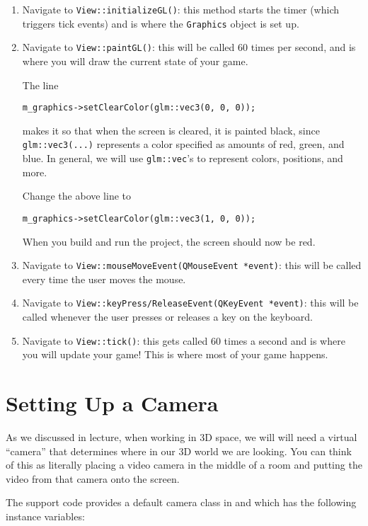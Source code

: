 \documentclass{cs195u}
\begin{document}
\begin{enumerate}
\item Navigate to \texttt{View::initializeGL()}: this method starts the timer (which triggers tick events) and is where the \texttt{Graphics} object is set up.

\item  Navigate to \texttt{View::paintGL()}: this will be called 60 times per second, and is where you will draw the current state of your game.

The line

         \texttt{m\_graphics->setClearColor(glm::vec3(0, 0, 0));}
         
makes it so that when the screen is cleared, it is painted black, since \texttt{glm::vec3(...)} represents a color specified as amounts of red, green, and blue. In general, we will use \texttt{glm::vec}’s to represent colors, positions, and more.

Change the above line to

         \texttt{m\_graphics->setClearColor(glm::vec3(1, 0, 0));}
         
When you build and run the project, the screen should now be red.

\item Navigate to \texttt{View::mouseMoveEvent(QMouseEvent *event)}: this will be called every time the user moves the mouse.

\item Navigate to \texttt{View::keyPress/ReleaseEvent(QKeyEvent *event)}: this will be called whenever the user presses or releases a key on the keyboard.

\item Navigate to \texttt{View::tick()}: this gets called 60 times a second and is where you will update your game! This is where most of your game happens.
\end{enumerate}

\section*{Setting Up a Camera}

As we discussed in lecture, when working in 3D space, we will will need a virtual “camera” that determines where in our 3D world we are looking. You can think of this as literally placing a video camera in the middle of a room and putting the video from that camera onto the screen.


The support code provides a default camera class in  and  which has the following instance variables:
\end{document}
